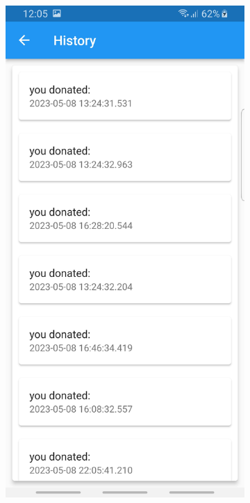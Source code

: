 \begin{figure}[H]
\begin{subfigure}{.31\textwidth}
  \label{fig:sub-third}
\end{subfigure}
\begin{subfigure}{.31\textwidth}
  \centering
  \includegraphics[width=1\linewidth]{images1/history.jpg} 

\end{subfigure}
\end{figure}
